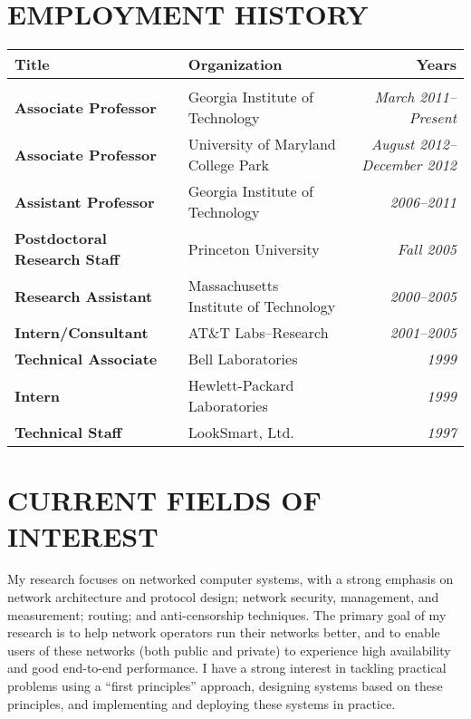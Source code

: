 \bigskip

\section*{EMPLOYMENT HISTORY}
\label{sec:employment}

\begin{center}
\begin{tabular}{p{2in}p{3in}r}
\textbf{Title} & \textbf{Organization} & \textbf{Years} \\ \hline \\[.1in]
{\bf Associate Professor} & Georgia Institute of Technology & {\em
March 2011--Present} \\
{\bf Associate Professor} & University of Maryland College Park & {\em
August 2012--December 2012} \\

{\bf Assistant Professor} & Georgia Institute of Technology & {\em
2006--2011} \\

{\bf Postdoctoral Research Staff} & Princeton University & {\em Fall 2005} \\

{\bf Research Assistant} & Massachusetts Institute of Technology & {\em
2000--2005} \\

{\bf Intern/Consultant} & AT\&T Labs--Research & {\em 2001--2005} \\
{\bf Technical Associate} & Bell Laboratories & {\em 1999} \\
{\bf Intern} & Hewlett-Packard Laboratories & {\em 1999} \\
{\bf Technical Staff} & LookSmart, Ltd. & {\em 1997} \\



\end{tabular}
\end{center}


\section*{CURRENT FIELDS OF INTEREST}
\label{sec:current}

My research focuses on networked computer systems, with a strong
emphasis on network architecture and protocol design; network security,
management, and measurement; routing; and anti-censorship techniques.
The primary goal of my research is to help network operators run their
networks better, and to enable users of these networks (both public and
private) to experience high availability and good end-to-end
performance.  I have a strong interest in tackling practical problems
using a ``first principles'' approach, designing systems
based on these principles, and implementing and deploying these systems
in practice.  

